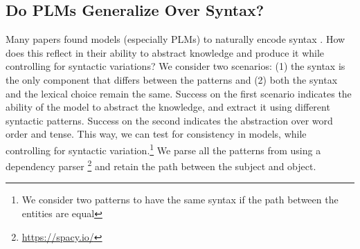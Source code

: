 


% 

% 





% 




\subsection{Do PLMs Generalize Over Syntax?} 



Many papers found models (especially PLMs) to naturally encode syntax \cite{linzen2016assessing,marvin-linzen-2018-targeted,yoav-syntax,hewitt2019structural}. How does this reflect in their ability to abstract knowledge and produce it while controlling for syntactic variations?
We consider two scenarios: (1) the syntax is the only component that differs between the patterns and (2) both the syntax and the lexical choice remain the same.
Success on the first scenario indicates the ability of the model to abstract the knowledge, and extract it using different syntactic patterns. Success on the second indicates the abstraction over word order and tense. This way, we can test for consistency in models, while controlling for syntactic variation.\footnote{We consider two patterns to have the same syntax if the path between the entities are equal} 
We parse all the patterns from \resource{} using a dependency parser \cite{spacy}\footnote{\url{https://spacy.io/}} and retain the path between the subject and object.


